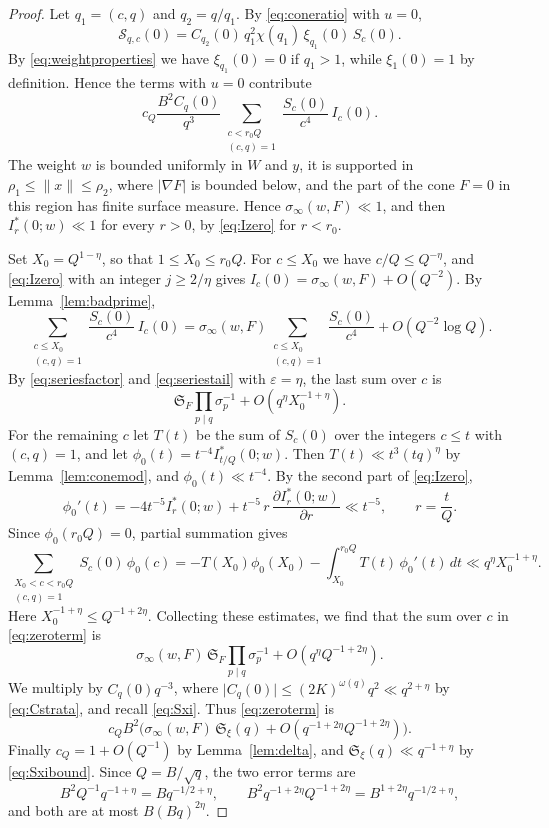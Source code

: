\documentclass[11pt]{amsart}
\numberwithin{equation}{section}
\numberwithin{figure}{section}
\theoremstyle{definition}
\renewcommand{\S}{\mathfrak{S}}
\newcommand{\eps}{\varepsilon}
\newcommand{\abs}[1]{\lvert #1\rvert}
\begin{document}
\begin{proof}
Let $q_1=(c,q)$ and $q_2=q/q_1$. By \eqref{eq:coneratio} with $u=0$,
\[
 \mathcal S_{q,c}(0)=C_{q_2}(0)\,q_1^2\chi(q_1)\,\xi_{q_1}(0)\,S_c(0).
\]
By \eqref{eq:weightproperties} we have $\xi_{q_1}(0)=0$ if $q_1>1$,
while $\xi_1(0)=1$ by definition. Hence the terms with $u=0$
contribute
\begin{equation}\label{eq:zeroterm}
 c_Q\frac{B^2C_q(0)}{q^3}
 \sum_{\substack{c<r_0Q\\(c,q)=1}}\frac{S_c(0)}{c^4}\,I_c(0).
\end{equation}
The weight $w$ is bounded uniformly in $W$ and $y$, it is supported
in $\rho_1\le\lVert x\rVert\le\rho_2$, where $\abs{\nabla F}$ is
bounded below, and the part of the cone $F=0$ in this region has
finite surface measure. Hence $\sigma_\infty(w,F)\ll1$, and then
$I_r^*(0;w)\ll1$ for every $r>0$, by \eqref{eq:Izero} for $r<r_0$.

Set $X_0=Q^{1-\eta}$, so that $1\le X_0\le r_0Q$. For $c\le X_0$ we
have $c/Q\le Q^{-\eta}$, and \eqref{eq:Izero} with an integer
$j\ge2/\eta$ gives $I_c(0)=\sigma_\infty(w,F)+O(Q^{-2})$. By
Lemma~\ref{lem:badprime},
\[
 \sum_{\substack{c\le X_0\\(c,q)=1}}\frac{S_c(0)}{c^4}\,I_c(0)
 =\sigma_\infty(w,F)\sum_{\substack{c\le X_0\\(c,q)=1}}\frac{S_c(0)}{c^4}
 +O(Q^{-2}\log Q).
\]
By \eqref{eq:seriesfactor} and \eqref{eq:seriestail} with
$\eps=\eta$, the last sum over $c$ is
\[
 \S_F\prod_{p\mid q}\sigma_p^{-1}+O(q^\eta X_0^{-1+\eta}).
\]
For the remaining $c$ let $T(t)$ be the sum of $S_c(0)$ over the
integers $c\le t$ with $(c,q)=1$, and let
$\phi_0(t)=t^{-4}I_{t/Q}^*(0;w)$. Then $T(t)\ll t^3(tq)^\eta$ by
Lemma~\ref{lem:conemod}, and $\phi_0(t)\ll t^{-4}$. By the second
part of \eqref{eq:Izero},
\[
 \phi_0'(t)=-4t^{-5}I_r^*(0;w)
 +t^{-5}\,r\,\frac{\partial I_r^*(0;w)}{\partial r}\ll t^{-5},
 \qquad r=\frac tQ.
\]
Since $\phi_0(r_0Q)=0$, partial summation gives
\[
 \sum_{\substack{X_0<c<r_0Q\\(c,q)=1}}S_c(0)\,\phi_0(c)
 =-T(X_0)\phi_0(X_0)-\int_{X_0}^{r_0Q}T(t)\,\phi_0'(t)\,dt
 \ll q^\eta X_0^{-1+\eta}.
\]
Here $X_0^{-1+\eta}\le Q^{-1+2\eta}$. Collecting these estimates, we
find that the sum over $c$ in \eqref{eq:zeroterm} is
\[
 \sigma_\infty(w,F)\,\S_F\prod_{p\mid q}\sigma_p^{-1}
 +O(q^\eta Q^{-1+2\eta}).
\]
We multiply by $C_q(0)q^{-3}$, where
$\abs{C_q(0)}\le(2K)^{\omega(q)}q^2\ll q^{2+\eta}$ by
\eqref{eq:Cstrata}, and recall \eqref{eq:Sxi}. Thus
\eqref{eq:zeroterm} is
\[
 c_QB^2\big(\sigma_\infty(w,F)\,\S_\xi(q)
 +O(q^{-1+2\eta}Q^{-1+2\eta})\big).
\]
Finally $c_Q=1+O(Q^{-1})$ by Lemma~\ref{lem:delta}, and
$\S_\xi(q)\ll q^{-1+\eta}$ by \eqref{eq:Sxibound}. Since
$Q=B/\sqrt q$, the two error terms are
\[
 B^2Q^{-1}q^{-1+\eta}=Bq^{-1/2+\eta},\qquad
 B^2q^{-1+2\eta}Q^{-1+2\eta}=B^{1+2\eta}q^{-1/2+\eta},
\]
and both are at most $B(Bq)^{2\eta}$.
\end{proof}
\end{document}
